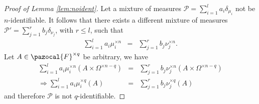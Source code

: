 \documentclass{article} %
\def\sF{\pazocal{F}}
\def\sP{\mathscr{P}}
\theoremstyle{definition}
\begin{document}
\begin{proof}[Proof of Lemma \ref{lem:noident}]
	Let a mixture of measures $\sP = \sum_{i=1}^l a_i \delta_{\mu_i}$ not be $n$-identifiable. It follows that there exists a different mixture of measures $\sP' = \sum_{j=1}^r b_j \delta_{\nu_j}$, with $r\le l$, such that
\begin{eqnarray*}
	\sum_{i=1}^l a_i \mu_i^{\times n} &=& \sum_{j=1}^r b_j \nu_j^{\times n}.
\end{eqnarray*}
Let $A \in \sF^{\times q}$ be arbitrary, we have
\begin{eqnarray*}
	\sum_{i=1}^l a_i \mu_i^{\times n}\left( A\times \Omega^{\times n-q} \right) &=& \sum_{j=1}^r b_j \nu_j^{\times n}\left( A\times \Omega^{\times n-q} \right)\\
	\Rightarrow \sum_{i=1}^l a_i \mu_i^{\times q}\left( A  \right) &=& \sum_{j=1}^r b_j \nu_j^{\times q}\left( A \right)
\end{eqnarray*}
and therefore $\sP$ is not $q$-identifiable.
\end{proof}
\end{document}
